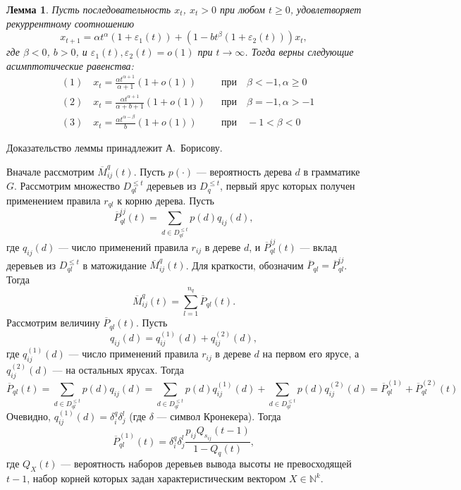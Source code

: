 \documentclass[12pt]{article}
\renewcommand{\leq}{\leqslant}
\renewcommand{\geq}{\geqslant}
\renewcommand{\epsilon}{\varepsilon}
\newtheorem{lemma}{Лемма}
\begin{document}
{\begin{lemma}
\label{l:xab}
	Пусть последовательность $x_t$, $x_t > 0$ при любом $t \geq 0$, удовлетворяет рекуррентному соотношению
	\begin{equation*}
		x_{t+1} = \alpha t^\alpha (1 + \epsilon_1(t)) + (1 - b t^\beta (1 + \epsilon_2(t))) x_t,
	\end{equation*}
	где $\beta < 0$, $b > 0$, и $\epsilon_1(t), \epsilon_2(t) = o(1)$ при $t \rightarrow \infty$. Тогда верны следующие асимптотические равенства:
	\begin{align}
		&(1)\quad x_t = \frac{\alpha t^{\alpha + 1}}{\alpha + 1} (1 + o(1))     & &\text{при}\quad \beta < -1, \alpha \geq 0 \\
		&(2)\quad x_t = \frac{\alpha t^{\alpha + 1}}{\alpha + b + 1} (1 + o(1)) & &\text{при}\quad \beta = -1, \alpha > -1 \\
		&(3)\quad x_t = \frac{\alpha t^{\alpha - \beta}}{b} (1 + o(1))          & &\text{при}\quad -1 < \beta < 0
	\end{align}
\end{lemma}
Доказательство леммы принадлежит А.~Борисову.

Вначале рассмотрим $\overline{M}^q_{ij}(t)$. Пусть $p(\cdot)$ --- вероятность дерева $d$ в грамматике $G$. Рассмотрим множество $D^{\leq t}_{ql}$ деревьев из $D^{\leq t}_q$, первый ярус которых получен применением правила $r_{ql}$ к корню дерева. Пусть
\begin{equation*}
	\overline{P}^{ij}_{ql}(t) = \sum_{d \in D^{\leq t}_{ql}} p(d) q_{ij}(d),
\end{equation*}
где $q_{ij}(d)$ --- число применений правила $r_{ij}$ в дереве $d$, и $\overline{P}^{ij}_{ql}(t)$ --- вклад деревьев из $D^{\leq t}_{ql}$ в матожидание $\overline{M}^q_{ij}(t)$. Для краткости, обозначим $\overline{P}_{ql} = \overline{P}^{ij}_{ql}$. Тогда
\begin{equation}
\label{eq:m_line_sum}
	\overline{M}^q_{ij}(t) = \sum_{l = 1}^{n_q} \overline{P}_{ql}(t).
\end{equation}
Рассмотрим величину $\overline{P}_{ql}(t)$. Пусть
\begin{equation*}
	q_{ij}(d) = q^{(1)}_{ij}(d) + q^{(2)}_{ij}(d),
\end{equation*}
где $q^{(1)}_{ij}(d)$ --- число применений правила $r_{ij}$ в дереве $d$ на первом его ярусе, а $q^{(2)}_{ij}(d)$ --- на остальных ярусах. Тогда
\begin{equation*}
	\overline{P}_{ql}(t) = \sum_{d \in D^{\leq t}_{ql}} p(d) q_{ij}(d) = \sum_{d \in D^{\leq t}_{ql}} p(d) q^{(1)}_{ij}(d) + \sum_{d \in D^{\leq t}_{ql}} p(d) q^{(2)}_{ij}(d) = \overline{P}^{(1)}_{ql} + \overline{P}^{(2)}_{ql}(t)
\end{equation*}
Очевидно, $q^{(1)}_{ij}(d) = \delta^q_i \delta^l_j$ (где $\delta$ --- символ Кронекера). Тогда
\begin{equation*}
	\overline{P}^{(1)}_{ql}(t) = \delta^q_i \delta^l_j \frac{p_{ij} Q_{s_{ij}}(t-1)}{1 - Q_q(t)},
\end{equation*}
где $Q_X(t)$ --- вероятность наборов деревьев вывода высоты не превосходящей $t-1$, набор корней которых задан характеристическим вектором $X \in \mathbb{N}^k$.

}
\end{document}

